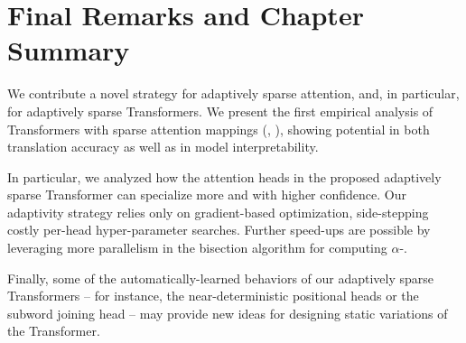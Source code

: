\section{Final Remarks and Chapter Summary}

We contribute a novel strategy for adaptively sparse attention, and,
in particular, for adaptively sparse Transformers. We present the
first empirical analysis of Transformers with sparse attention
mappings (\ie, \entmaxtext), showing potential in both translation
accuracy as well as in model interpretability.

In particular, we analyzed how the attention heads in the proposed
adaptively sparse Transformer can specialize more and with higher
confidence. Our adaptivity strategy relies only on gradient-based
optimization, side-stepping costly per-head hyper-parameter searches.
Further speed-ups are possible by leveraging more parallelism in the
bisection algorithm for computing $\alpha$-\entmaxtext.

Finally, some of the automatically-learned behaviors of our
adaptively sparse Transformers -- for instance, the
near-deterministic positional heads or the subword joining head --
may provide new ideas for designing static variations of the
Transformer.

\cleardoublepage
